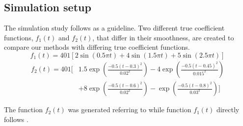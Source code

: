 \documentclass[11pt,twoside,a4paper]{article}
\begin{document}
    \subsection{Simulation setup}
	The simulation study follows \cite{Reiss_2007b} as a guideline. Two different true coefficient functions,  $f_1(t)$ and  $f_2(t)$, that differ in their smoothness, are created to compare our methods with differing true coefficient functions.
	\begin{equation}
    	f_1(t) = 401 \left[ 2\sin(0.5\pi t) + 4\sin(1.5 \pi t) + 5\sin(2.5 \pi t) \right]
    \end{equation}
    \begin{equation}
    	\begin{split}
    		f_2(t) = 401  \Bigg[ & 1.5 \exp{\left(\frac{-0.5(t-0.3)^2}{0.02^2}\right)} - 4 \exp{\left(\frac{-0.5(t-0.45)^2}{0.015^2}\right)} \\
    				 & + 8 \exp{\left(\frac{-0.5(t-0.6)^2}{0.02^2}\right)} -  \exp{\left(\frac{-0.5(t-0.8)^2}{0.03^2}\right)} \Bigg]
    	\end{split}
    \end{equation}
    
    The function $f_2(t)$ was generated referring to \cite{cardot_bumpyfunction_2002} while function $f_1(t)$ directly follows \cite{Reiss_2007b}. 
\end{document}
